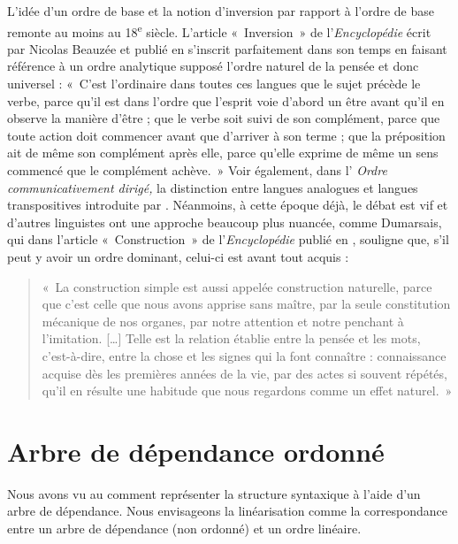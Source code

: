 {    L’idée d’un ordre de base et la notion d’inversion par rapport à l’ordre de base remonte au moins au 18\textsuperscript{e} siècle. L’article «~Inversion~» de l’\textit{Encyclopédie} écrit par Nicolas Beauzée et publié en \citeyear{Beauzée1765} s’inscrit parfaitement dans son temps en faisant référence à un ordre analytique supposé l’ordre naturel de la pensée et donc universel : «~C’est l’ordinaire dans toutes ces langues que le sujet précède le verbe, parce qu’il est dans l’ordre que l’esprit voie d’abord un être avant qu’il en observe la manière d’être ; que le verbe soit suivi de son complément, parce que toute action doit commencer avant que d’arriver à son terme ; que la préposition ait de même son complément après elle, parce qu’elle exprime de même un sens commencé que le complément achève.~» Voir également, dans l’ \textit{Ordre communicativement dirigé,} la distinction entre langues analogues et langues transpositives introduite par \citet{girad1747vrais}. Néanmoins, à cette époque déjà, le débat est vif et d’autres linguistes ont une approche beaucoup plus nuancée, comme Dumarsais, qui dans l’article «~Construction~» de l’\textit{Encyclopédie} publié en \citeyear{Dumarsais1754}, souligne que, s’il peut y avoir un ordre dominant, celui-ci est avant tout acquis : 
    \begin{quote}
   «~La construction simple est aussi appelée construction naturelle, parce que c’est celle que nous avons apprise sans maître, par la seule constitution mécanique de nos organes, par notre attention et notre penchant à l’imitation. […] Telle est la relation établie entre la pensée et les mots, c’est-à-dire, entre la chose et les signes qui la font connaître : connaissance acquise dès les premières années de la vie, par des actes si souvent répétés, qu’il en résulte une habitude que nous regardons comme un effet naturel.~»
    \end{quote}
}
\section{Arbre de dépendance ordonné}\label{sec:3.5.9}

Nous avons vu au  comment représenter la structure syntaxique à l’aide d’un arbre de dépendance. Nous envisageons la linéarisation comme la correspondance entre un arbre de dépendance (non ordonné) et un ordre linéaire. 


